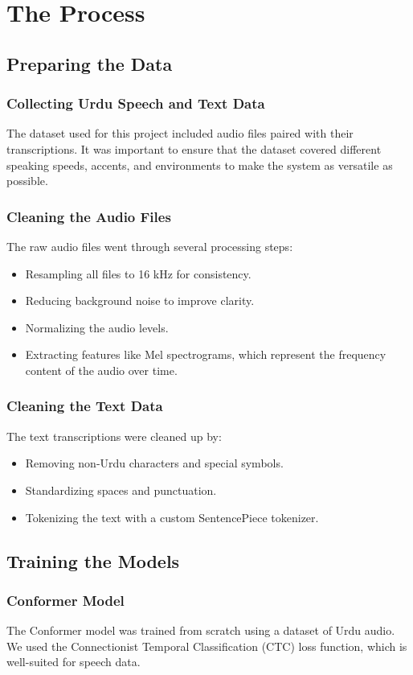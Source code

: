 \documentclass[12pt,a4paper]{report}
\begin{document}
\chapter{The Process}
\section{Preparing the Data}
\subsection{Collecting Urdu Speech and Text Data}
The dataset used for this project included audio files paired with their transcriptions. It was important to ensure that the dataset covered different speaking speeds, accents, and environments to make the system as versatile as possible.

\subsection{Cleaning the Audio Files}
The raw audio files went through several processing steps:
\begin{itemize}
    \item Resampling all files to 16 kHz for consistency.
    \item Reducing background noise to improve clarity.
    \item Normalizing the audio levels.
    \item Extracting features like Mel spectrograms, which represent the frequency content of the audio over time.
\end{itemize}

\subsection{Cleaning the Text Data}
The text transcriptions were cleaned up by:
\begin{itemize}
    \item Removing non-Urdu characters and special symbols.
    \item Standardizing spaces and punctuation.
    \item Tokenizing the text with a custom SentencePiece tokenizer.
\end{itemize}

\section{Training the Models}
\subsection{Conformer Model}
The Conformer model was trained from scratch using a dataset of Urdu audio. We used the Connectionist Temporal Classification (CTC) loss function, which is well-suited for speech data.
\end{document}
